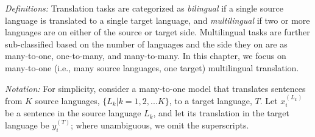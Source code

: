 \textit{Definitions:} Translation tasks are categorized as \textit{bilingual} if a single source language is translated to a single target language, and \textit{multilingual} if two or more languages are on either of the source or target side. Multilingual tasks are further sub-classified based on the number of languages and the side they on are as many-to-one, one-to-many, and many-to-many. 
In this chapter, we focus on many-to-one (i.e., many source languages, one target) multilingual translation.

\textit{Notation:} For simplicity, consider a many-to-one model that translates sentences from $K$ source languages,  $\{L_k | k = 1, 2, ... K\}$, to a target language, $T$.
Let $x_{i}^{(L_k)}$ be a sentence in the source language $L_k$, and let its translation in the target language be $y_{i}^{(T)}$; where unambiguous, we omit the superscripts.

